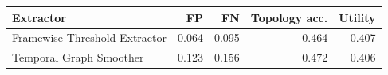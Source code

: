 \begin{tabular}{lrrrr}
\toprule
Extractor & FP & FN & Topology acc. & Utility \\
\midrule
Framewise Threshold Extractor & 0.064 & 0.095 & 0.464 & 0.407 \\
Temporal Graph Smoother & 0.123 & 0.156 & 0.472 & 0.406 \\
\bottomrule
\end{tabular}
